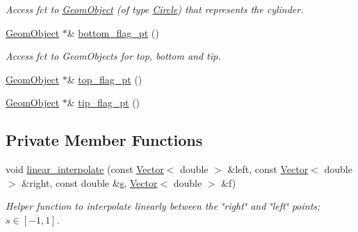 \begin{DoxyCompactItemize}
\begin{DoxyCompactList}\small\item\em Access fct to \hyperlink{classoomph_1_1GeomObject}{Geom\+Object} (of type \hyperlink{classoomph_1_1Circle}{Circle}) that represents the cylinder. \end{DoxyCompactList}\item 
\hyperlink{classoomph_1_1GeomObject}{Geom\+Object} $\ast$\& \hyperlink{classoomph_1_1CylinderWithFlagDomain_a4da493b4e9ddc3fc62f6beb269781e81}{bottom\+\_\+flag\+\_\+pt} ()
\begin{DoxyCompactList}\small\item\em Access fct to Geom\+Objects for top, bottom and tip. \end{DoxyCompactList}\item 
\hyperlink{classoomph_1_1GeomObject}{Geom\+Object} $\ast$\& \hyperlink{classoomph_1_1CylinderWithFlagDomain_a268642db566b31b686ba8185e8610d8a}{top\+\_\+flag\+\_\+pt} ()
\item 
\hyperlink{classoomph_1_1GeomObject}{Geom\+Object} $\ast$\& \hyperlink{classoomph_1_1CylinderWithFlagDomain_a9977cf9b4b71f83ba0f4d253164d4e00}{tip\+\_\+flag\+\_\+pt} ()
\end{DoxyCompactItemize}
\subsection*{Private Member Functions}
\begin{DoxyCompactItemize}
\item 
void \hyperlink{classoomph_1_1CylinderWithFlagDomain_aa0f0db0fdf2b271a6dde42ef36e9d40d}{linear\+\_\+interpolate} (const \hyperlink{classoomph_1_1Vector}{Vector}$<$ double $>$ \&left, const \hyperlink{classoomph_1_1Vector}{Vector}$<$ double $>$ \&right, const double \&\hyperlink{cfortran_8h_ab7123126e4885ef647dd9c6e3807a21c}{s}, \hyperlink{classoomph_1_1Vector}{Vector}$<$ double $>$ \&f)
\begin{DoxyCompactList}\small\item\em Helper function to interpolate linearly between the \char`\"{}right\char`\"{} and \char`\"{}left\char`\"{} points; $ s \in [-1,1] $. \end{DoxyCompactList}\end{DoxyCompactItemize}
